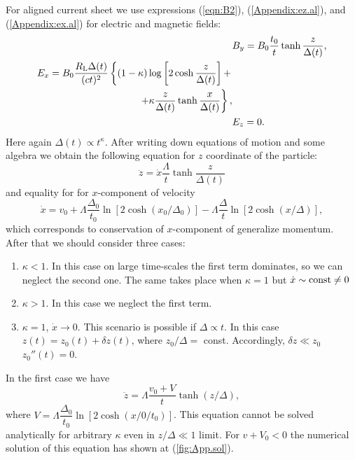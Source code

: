 \documentclass[useAMS,usenatbib]{mn2e}
\begin{document}
For aligned current sheet we use expressions (\ref{eqn:B2}), (\ref{Appendix:ez.al}), and
(\ref{Appendix:ex.al}) for electric and magnetic fields:
\begin{align}
& B_y   = B_0 \frac{t_0}{t} \tanh\frac{z}{\Delta(t)},\\
\begin{split}
 E_x = B_0\dfrac{R_{\rm L}\Delta(t)}{(ct)^2} 
\left\{(1-\kappa)\log\left[2\cosh\dfrac{z}{\Delta(t)}\right]+\right.\\
\left.+\kappa\dfrac{z}{\Delta(t)}\tanh\frac{x}{\Delta(t)}\right\},
\end{split}
\\
&E_z = 0.
\end{align}
Here again $\Delta(t)\propto t^{\kappa}$. After writing down equations of motion and some 
algebra we obtain the following equation for $z$ coordinate of the particle:
\begin{equation}
\ddot{z}=\dot{x}\dfrac{\Lambda}{t}\tanh\dfrac{z}{\Delta(t)}
\end{equation} 
 and equality for for $x$-component of velocity
 \begin{equation}
 \dot{x}=v_0+\Lambda\dfrac{\Delta_0}{t_0}\ln[2\cosh(x_0/\Delta_0)]-\Lambda\dfrac{\Delta}{t}\ln[2\cosh(x/\Delta)],
 \end{equation}
which corresponds to conservation of $x$-component of generalize momentum. 
After that we should consider three cases:
 \begin{enumerate}
 \item 
 $\kappa < 1$. In this case on large time-scales the first term dominates, 
so we can neglect the second one. The same takes place when $\kappa=1$ but $\dot{x}\sim {\rm const}\neq0$
\item
 $\kappa > 1$. In this case we neglect the first term.
\item
$\kappa = 1$, $\dot{x}\rightarrow 0$. This scenario is possible if $\Delta\propto t$. 
In this case $z(t)=z_0(t)+\delta z(t)$, where $z_0/\Delta =$ const.
Accordingly, $\delta z\ll z_0$ $z_0''(t)=0$.  
\end{enumerate}  
In the first case we have
  \begin{equation}
  \label{App.case1}
  \ddot{z}=\Lambda\dfrac{v_0+V}{t}\tanh(z/\Delta),
  \end{equation}
  where $V=\Lambda\dfrac{\Delta_0}{t_0}\ln[2\cosh(x/0/t_0)]$.
This equation cannot be solved analytically for arbitrary $\kappa$ even in $z/\Delta\ll 1$ limit. For $v+V_0<0$ the numerical solution of this equation has shown at (\ref{fig:App.sol}).
\end{document}
